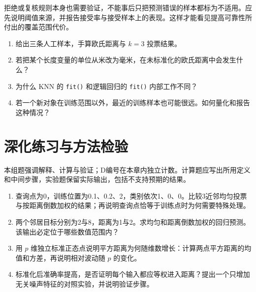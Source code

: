 拒绝或复核规则本身也需要验证，不能事后只把预测错误的样本都标为不适用。应先说明阈值来源，并报告接受率与接受样本上的表现。这样才能看见提高可靠性所付出的覆盖范围代价。

\chapterexercise
\begin{enumerate}
\item 给出三条人工样本，手算欧氏距离与 $k=3$ 投票结果。
\item 若把某个长度变量的单位从米改为毫米，在未标准化的欧氏距离中会发生什么？
\item 为什么 KNN 的 \texttt{fit()} 和逻辑回归的 \texttt{fit()} 内部工作不同？
\item 若一个新对象在训练范围以外，最近的训练样本也可能很远。如何量化和报告这种情况？
\end{enumerate}

\section*{深化练习与方法检验}
本组题强调解释、计算与验证；D编号在本章内独立计数。计算题应写出所用定义和中间步骤，实验题保留实际输出，包括不支持预期的结果。
\begin{enumerate}[label=D\arabic*.]
\item 查询点为0，训练位置为0.1、0.2、2，类别依次1、0、0。比较3近邻均匀投票与按距离倒数加权的结果；再说明查询点恰等于训练点时为何需要特殊处理。
\item 两个邻居目标分别为2与8，距离为1与2。求均匀和距离倒数加权的回归预测。该输出必定位于哪些数值范围内？
\item 用 $p$ 维独立标准正态点说明平方距离为何随维数增长：计算两点平方距离的均值和方差，再说明相对波动随 $p$ 的变化。
\item 标准化后准确率提高，是否证明每个输入都应等权进入距离？提出一个只增加无关噪声特征的对照实验，并说明验证步骤。
\end{enumerate}
